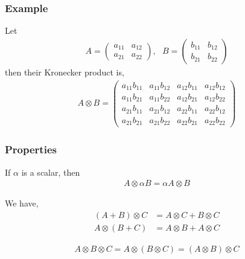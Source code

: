 \subsubsection*{Example}
Let 
\begin{align*}
A = 
\left(\begin{array}{cc}
a_{11} & a_{12}
\\
a_{21} & a_{22}
\end{array}\right),~~~
B = 
\left(\begin{array}{cc}
b_{11} & b_{12}
\\
b_{21} & b_{22}
\end{array}\right)
\end{align*}
then their Kronecker product is,
\begin{align}
A \otimes B = 
\left(\begin{array}{cccc}
a_{11}b_{11} & a_{11}b_{12} & a_{12}b_{11} & a_{12}b_{12}
\\
a_{11}b_{21} & a_{11}b_{22} & a_{12}b_{21} & a_{12}b_{22}
\\
a_{21}b_{11} & a_{21}b_{12} & a_{22}b_{11} & a_{22}b_{12}
\\
a_{21}b_{21} & a_{21}b_{22} & a_{22}b_{21} & a_{22}b_{22}
\end{array}\right)
\end{align}


\subsubsection*{Properties}
\begin{proposition}
If $\alpha$ is a scalar, then 
\begin{align}
A \otimes \alpha B = \alpha A \otimes B
\end{align}
\end{proposition}

\begin{proposition}
We have,
\begin{align}
( A + B ) \otimes C &= A \otimes C + B \otimes C
\\
A \otimes ( B + C ) &= A \otimes B + A \otimes C
\end{align}
\end{proposition}

\begin{proposition}[Associativity]
\begin{align}
A \otimes B \otimes C = A \otimes ( B \otimes C ) = ( A \otimes B ) \otimes C
\end{align}
\end{proposition}

